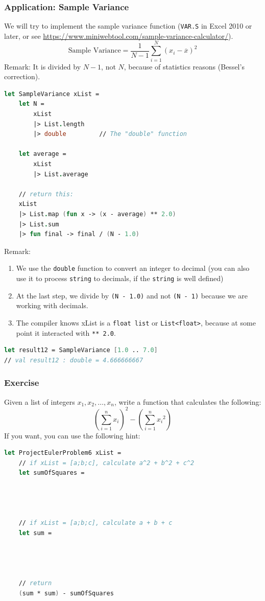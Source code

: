 \documentclass[12pt]{article}
\begin{document}
\subsubsection*{Application: Sample Variance}
We will try to implement the sample variance function (\texttt{VAR.S} in Excel 2010 or later, or see \url{https://www.miniwebtool.com/sample-variance-calculator/}).
\[
\text{Sample Variance} = \dfrac{1}{N - 1} \sum_{i=1}^N \left(x_i - \overline{x}\right)^2
\]
Remark: It is divided by $N-1$, not $N$, because of statistics reasons (Bessel's correction).
\begin{lstlisting}[language=FSharp]
let SampleVariance xList =
    let N = 
        xList
        |> List.length
        |> double         // The "double" function 

    let average = 
        xList
        |> List.average

    // return this:
    xList
    |> List.map (fun x -> (x - average) ** 2.0)
    |> List.sum
    |> fun final -> final / (N - 1.0)       
\end{lstlisting}
Remark:
\begin{enumerate}
\item We use the \texttt{double} function to convert an integer to decimal (you can also use it to process \texttt{string} to decimals, if the \texttt{string} is well defined)
\item At the last step, we divide by \texttt{(N - 1.0)} and not \texttt{(N - 1)} because we are working with decimals.
\item The compiler knows xList is a \texttt{float list} or \texttt{List<float>}, because at some point it interacted with \texttt{** 2.0}. 
\end{enumerate}
\begin{lstlisting}[language=FSharp]
let result12 = SampleVariance [1.0 .. 7.0]      
// val result12 : double = 4.666666667
\end{lstlisting}

\pagebreak

\subsubsection*{Exercise}
Given a list of integers $x_1, x_2, \ldots, x_n$, write a function that calculates the following:
\[
\left(\sum_{i=1}^n x_i\right)^2 - \left(\sum_{i=1}^n {x_i}^2\right)
\]
If you want, you can use the following hint:
\begin{lstlisting}[language=FSharp]
let ProjectEulerProblem6 xList =
    // if xList = [a;b;c], calculate a^2 + b^2 + c^2
    let sumOfSquares = 




    // if xList = [a;b;c], calculate a + b + c
    let sum =




    // return
    (sum * sum) - sumOfSquares
\end{lstlisting}
\end{document}
